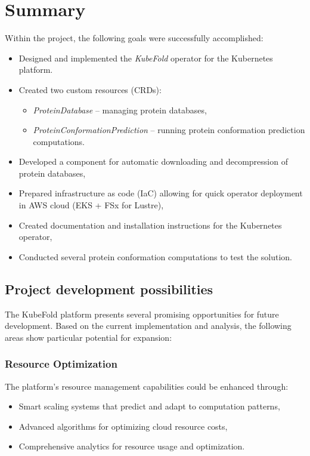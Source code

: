 \chapter{Summary}

Within the project, the following goals were successfully accomplished:
\begin{itemize}
    \item Designed and implemented the \textit{KubeFold} operator for the Kubernetes platform.
    \item Created two custom resources (CRDs):
    \begin{itemize}
        \item \textit{ProteinDatabase} – managing protein databases,
        \item \textit{ProteinConformationPrediction} – running protein conformation prediction computations.
    \end{itemize}
    \item Developed a component for automatic downloading and decompression of protein databases,
    \item Prepared infrastructure as code (IaC) allowing for quick operator deployment in AWS cloud (EKS + FSx for Lustre),
    \item Created documentation and installation instructions for the Kubernetes operator,
    \item Conducted several protein conformation computations to test the solution.
\end{itemize}


\section{Project development possibilities}

The KubeFold platform presents several promising opportunities for future development.
Based on the current implementation and analysis, the following areas show particular potential for expansion:

\subsection{Resource Optimization}
The platform's resource management capabilities could be enhanced through:
\begin{itemize}
    \item Smart scaling systems that predict and adapt to computation patterns,
    \item Advanced algorithms for optimizing cloud resource costs,
    \item Comprehensive analytics for resource usage and optimization.
\end{itemize}

